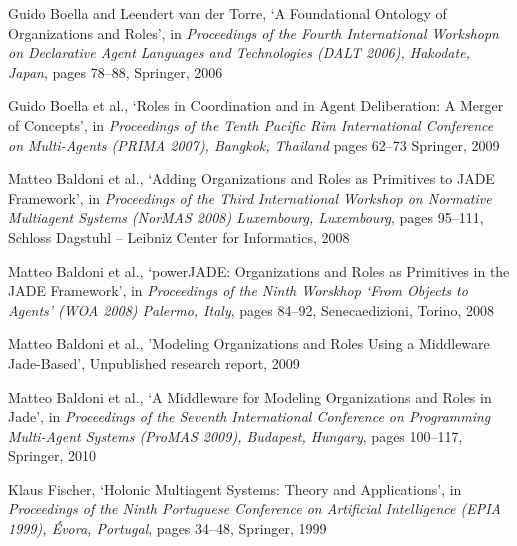 \begin{thebibliography}{99}
Guido Boella and Leendert van der Torre,
`A Foundational Ontology of Organizations and Roles',
in \textit{Proceedings of the Fourth International Workshopn on Declarative Agent Languages and Technologies (DALT 2006), Hakodate, Japan},
pages 78--88,
Springer, 2006

Guido Boella et al., %
`Roles in Coordination and in Agent Deliberation: A Merger of Concepts',
in \textit{Proceedings of the Tenth Pacific Rim International Conference on Multi-Agents (PRIMA 2007), Bangkok, Thailand}
pages 62--73
Springer, 2009


Matteo Baldoni et al., %
`Adding Organizations and Roles as Primitives to JADE Framework',
in \textit{Proceedings of the Third International Workshop on Normative Multiagent Systems (NorMAS 2008) Luxembourg, Luxembourg},
pages 95--111,
Schloss Dagstuhl -- Leibniz Center for Informatics, 2008

Matteo Baldoni et al., %
`powerJADE: Organizations and Roles as Primitives in the JADE Framework',
in \textit{Proceedings of the Ninth Worskhop `From Objects to Agents' (WOA 2008) Palermo, Italy},
pages 84--92,
Senecaedizioni, Torino, 2008

Matteo Baldoni et al., %
'Modeling Organizations and Roles Using a Middleware Jade-Based',
Unpublished research report, 2009

Matteo Baldoni et al., %
`A Middleware for Modeling Organizations and Roles in Jade',
in \textit{Proceedings of the Seventh International Conference on Programming Multi-Agent Systems (ProMAS 2009), Budapest, Hungary},
pages 100--117,
Springer, 2010


Klaus Fischer,
`Holonic Multiagent Systems: Theory and Applications',
in \textit{Proceedings of the Ninth Portuguese Conference on Artificial Intelligence (EPIA 1999), Évora, Portugal},
pages 34--48,
Springer, 1999


\end{thebibliography}
